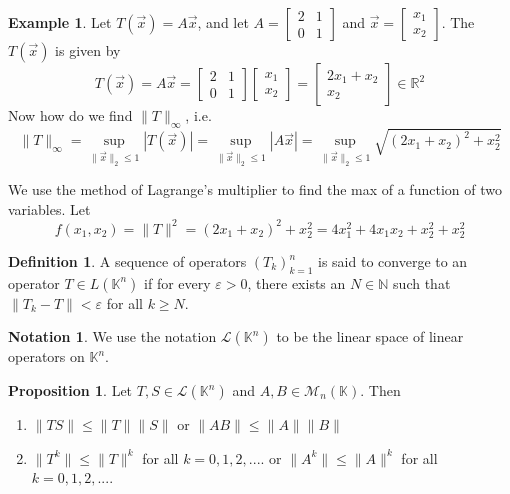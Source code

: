 \documentclass[11pt]{article}
\theoremstyle{definition}\newtheorem{definition}{Definition}
\theoremstyle{definition}\newtheorem{notation}{Notation}
\theoremstyle{definition}\newtheorem{example}{Example}
\theoremstyle{theorem}\newtheorem{theorem}{Theorem}
\theoremstyle{theorem}\newtheorem{corollary}{Corollary}
\theoremstyle{theorem}\newtheorem{proposition}{Proposition}
\theoremstyle{theorem}\newtheorem{lemma}{Lemma}
\theoremstyle{theorem}\newtheorem{question}{Question}
\theoremstyle{remark}\newtheorem{remark}{Remark}
\newcommand{\K}{\mathbb{K}}
\newcommand{\R}{\mathbb{R}}
\newcommand{\N}{\mathbb{N}}
\newcommand{\M}{\mathcal{M}}
\renewcommand{\L}{\mathscr{L}}
\newcommand{\e}{\varepsilon}
\begin{document}
\begin{example}
    Let $T(\vec{x}) = A\vec{x}$, and let $A = \begin{bmatrix} 2 & 1 \\ 0 & 1 \end{bmatrix}$ and $\vec{x} = \begin{bmatrix} x_1 \\ x_2 \end{bmatrix}$. The $T(\vec{x})$ is given by
    \begin{equation*}
        T(\vec{x}) = A\vec{x} = \begin{bmatrix} 2 & 1 \\ 0 & 1 \end{bmatrix} \begin{bmatrix} x_1 \\ x_2 \end{bmatrix} = \begin{bmatrix} 2x_1 + x_2 \\ x_2 \end{bmatrix} \in \R^2
    \end{equation*}
    Now how do we find $\|T\|_{\infty}$, i.e.
    \begin{equation*}
        \|T\|_{\infty} = \sup_{\|\vec{x}\|_2 \leq 1} |T(\vec{x})| = \sup_{\|\vec{x}\|_2 \leq 1} |A\vec{x}| = \sup_{\|\vec{x}\|_2 \leq 1} \sqrt{(2x_1 + x_2)^2 + x_2^2}
    \end{equation*}
\end{example}

We use the method of Lagrange's multiplier to find the max of a function of two variables. Let
\begin{equation*}
    f(x_1, x_2) = \|T\|^2 = (2x_1 + x_2)^2 + x_2^2 = 4x_1^2 + 4x_1x_2 + x_2^2 + x_2^2
\end{equation*}

\begin{definition}
    A sequence of operators $(T_k)_{k = 1}^{n}$ is said to converge to an operator $T \in L(\K^n)$ if for every $\e > 0$, there exists an $N \in \N$ such that $\|T_k - T\| < \e$ for all $k \geq N$.
\end{definition}

\begin{notation}
    We use the notation $\L(\K^n)$ to be the linear space of linear operators on $\K^n$.
\end{notation}

\begin{proposition}
    Let $T, S \in \L(\K^n)$ and $A, B \in \M_n(\K)$. Then
    \begin{enumerate}
        \item $\|TS\| \leq \|T\| \|S\|$ or $\|AB\| \leq \|A\| \|B\|$
        \item $\|T^k\| \leq \|T\|^k$ for all $k = 0, 1, 2,...$. or $\|A^k\| \leq \|A\|^k$ for all $k = 0, 1, 2,...$.
    \end{enumerate} 
\end{proposition}
\end{document}

